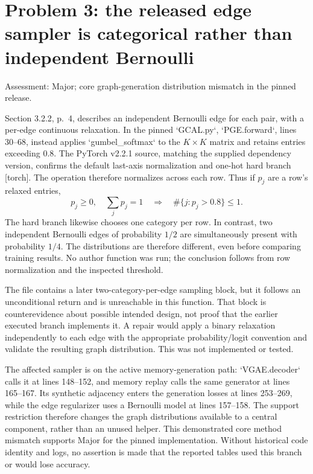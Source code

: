 \documentclass[10pt]{article}
\begin{document}
\section*{Problem 3: the released edge sampler is categorical rather than independent Bernoulli}
Assessment: Major; core graph-generation distribution mismatch in the pinned release.\par
Section 3.2.2, p. 4, describes an independent Bernoulli edge for each pair, with a per-edge continuous relaxation. In the pinned `GCAL.py`, `PGE.forward`, lines 30–68, instead applies `gumbel\_softmax` to the \(K\times K\) matrix and retains entries exceeding \(0.8\). The PyTorch v2.2.1 source, matching the supplied dependency version, confirms the default last-axis normalization and one-hot hard branch [torch]. The operation therefore normalizes across each row. Thus if \(p_j\) are a row’s relaxed entries, \[p_j\ge0,\quad\sum_jp_j=1
\quad\Longrightarrow\quad
\#\{j:p_j>0.8\}\le1.\] The hard branch likewise chooses one category per row. In contrast, two independent Bernoulli edges of probability \(1/2\) are simultaneously present with probability \(1/4\). The distributions are therefore different, even before comparing training results. No author function was run; the conclusion follows from row normalization and the inspected threshold.\par
The file contains a later two-category-per-edge sampling block, but it follows an unconditional return and is unreachable in this function. That block is counterevidence about possible intended design, not proof that the earlier executed branch implements it. A repair would apply a binary relaxation independently to each edge with the appropriate probability/logit convention and validate the resulting graph distribution. This was not implemented or tested.\par
The affected sampler is on the active memory-generation path: `VGAE.decoder` calls it at lines 148–152, and memory replay calls the same generator at lines 165–167. Its synthetic adjacency enters the generation losses at lines 253–269, while the edge regularizer uses a Bernoulli model at lines 157–158. The support restriction therefore changes the graph distributions available to a central component, rather than an unused helper. This demonstrated core method mismatch supports Major for the pinned implementation. Without historical code identity and logs, no assertion is made that the reported tables used this branch or would lose accuracy.\par
\end{document}
